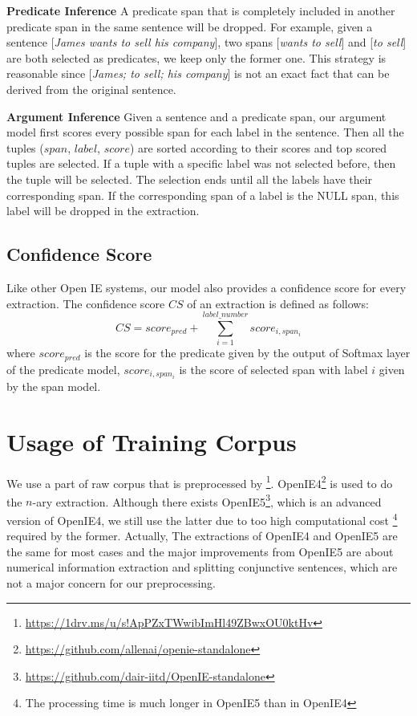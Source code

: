 \documentclass[letterpaper]{article} %
\begin{document}
\textbf{Predicate Inference} A predicate span that is completely included in another predicate span in the same sentence will be dropped. For example, given a sentence [\emph{James wants to sell his company}], two spans [\emph{wants to sell}] and [\emph{to sell}] are both selected as predicates, we keep only the former one. This strategy is reasonable since [\emph{James; to sell; his company}] is not an exact fact that can be derived from the original sentence.

\textbf{Argument Inference} Given a sentence and a predicate span, our argument model first scores every possible span for each label in the sentence. Then all the tuples ($span$, $label$, $score$) are sorted according to their scores and top scored tuples are selected. If a tuple with a specific label was not selected before, then the tuple will be selected. The selection ends until all the labels have their corresponding span. If the corresponding span of a label is the NULL span, this label will be dropped in the extraction.



\subsection{Confidence Score}
Like other Open IE systems, our model also provides a confidence score for every extraction. The confidence score $CS$ of an extraction is defined as follows:
\begin{equation}
        CS = score_{pred} + \sum_{i=1}^{label\_number}score_{i,span_i}
\end{equation}
where $score_{pred}$ is the score for the predicate given by the output of Softmax layer of the predicate model, $score_{i,span_i}$ is the score of selected span with label $i$ given by the span model.

\section{Usage of Training Corpus}
We use a part of raw corpus that is preprocessed by \cite{Cui2018NeuralOI}\footnote{\url{https://1drv.ms/u/s!ApPZxTWwibImHl49ZBwxOU0ktHv}}. OpenIE4\footnote{\url{https://github.com/allenai/openie-standalone}} is used to do the $n$-ary extraction. Although there exists OpenIE5\footnote{\url{https://github.com/dair-iitd/OpenIE-standalone}}, which is an advanced version of OpenIE4, we still use the latter due to too high computational cost \footnote{The processing time is much longer in OpenIE5 than in OpenIE4} required by the former. Actually, The extractions of OpenIE4 and OpenIE5 are the same for most cases and the major improvements from OpenIE5 are about numerical information extraction and splitting conjunctive sentences, which are not a major concern for our preprocessing.
\end{document}

